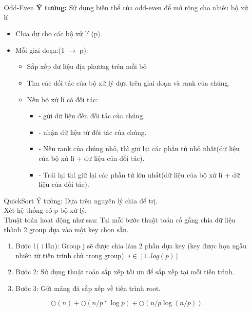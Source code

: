 \documentclass{beamer}
\newcommand{\bi}{\begin{itemize}}
\newcommand{\ei}{\end{itemize}}
\begin{document}
\begin{frame}{Odd-Even}
\textbf{Ý tưởng:} Sử dụng biến thể của odd-even để mở rộng cho nhiều bộ xử lí
\bi
\item Chia dữ cho các bộ xử lí (p).
\item Mỗi giai đoạn:(1 $\longrightarrow$ p):
\bi
\item Sắp xếp dư liệu địa phương trên mỗi bô
\item Tìm các đối tác của bộ xử lý dựa trên giai đoạn và rank của chúng.
\item Nếu bộ xử lí có đối tác:
\bi
\item[- ] gửi dữ liệu đến đối tác của chúng.
\item[- ] nhận dữ liệu từ đối tác của chúng.
\item[- ] Nếu rank của chúng nhỏ, thì giữ lại các phần tử nhỏ nhất(dữ liệu của bộ xử lí + dư liệu của đối tác).
\item[- ] Trái lại thì giữ lại các phần tử lớn nhất(dữ liệu của bộ xử lí + dữ liệu của đối tác).
\ei
\ei
\ei

\end{frame}
\begin{frame}{QuickSort}
Ý tưởng: Dựa trên nguyên lý chia để trị.\\
	Xét hệ thống có p bộ xử lý.\\
	Thuật toán hoạt động như sau:
	Tại mỗi bước thuật toán cố gắng chia dữ liệu thành 2 group dựa vào một key chọn sẵn.
	\begin{enumerate}
		\item Bước 1( i lần): Group j sẽ được chia làm 2 phần dựa key (key được họn ngẫu nhiên từ tiến trình chủ trong group). $i \in [1..log(p)]$
		\item Bước 2: Sử dụng thuật toán sắp xếp tối ưu để sắp xếp tại mỗi tiến trình.
		\item Bước 3: Gửi mảng đã sắp xếp về tiến trình root.
\end{enumerate}
$$\bigcirc(n)+\bigcirc(n/p*\log p)+\bigcirc(n/p \log (n/p))$$
\end{frame}
\end{document}
